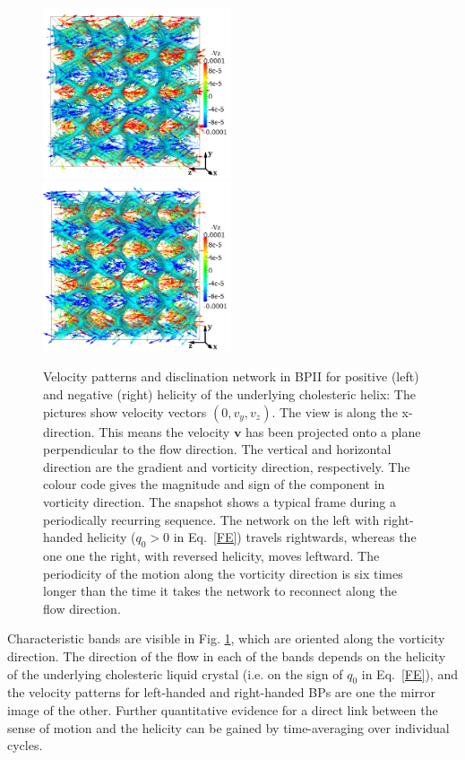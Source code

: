 \documentclass[8.5pt,twoside,twocolumn]{article}
\begin{document}
\begin{figure}[htpb]
\includegraphics[width=0.495\textwidth]{v_yz-v_z-160k_run902r.png}
\includegraphics[width=0.495\textwidth]{v_yz-v_z-160k_run903r.png}
\caption{Velocity patterns and disclination network in BPII for positive (left) and negative (right) helicity of the 
underlying cholesteric helix: The pictures show velocity vectors $(0,v_y,v_z)$.
The view is along the x-direction. This means the velocity ${\mathbf v}$ 
has been projected onto a plane perpendicular to the flow direction. 
The vertical and horizontal direction are the gradient and vorticity direction, respectively.
The colour code gives the magnitude and sign of the component in vorticity direction.
The snapshot shows a typical frame during a periodically recurring sequence.
The network on the left with right-handed helicity ($q_0>0$ in Eq.~\ref{FE}) travels rightwards, whereas the one one the right,
with reversed helicity, moves leftward. 
The periodicity of the motion along the vorticity direction is six times longer than the time 
it takes the network to reconnect along the flow direction.}
\label{bp2-1-velo}
\end{figure}

Characteristic bands are visible in Fig. \ref{bp2-1-velo}, which are 
oriented along the vorticity direction. The direction of the flow
in each of the bands depends on the helicity of the underlying cholesteric
liquid crystal (i.e. on the sign of $q_0$ in Eq.~\ref{FE}), and the velocity
patterns for left-handed and right-handed BPs are one the mirror image of
the other. 
Further quantitative evidence for a direct link between the sense of motion 
and the helicity can be gained by time-averaging over individual cycles.
\end{document}
